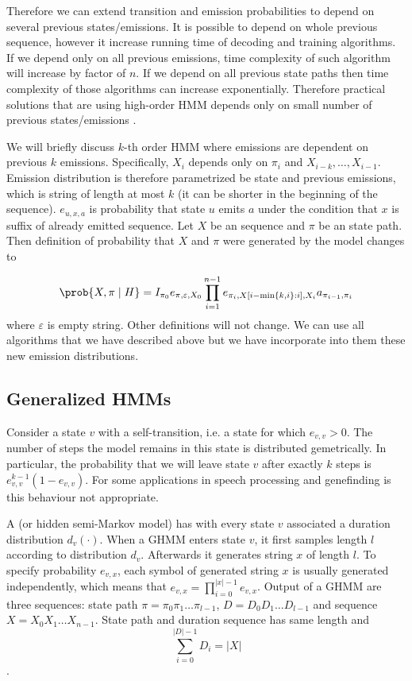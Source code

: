 Therefore we can extend transition and emission probabilities to depend on
several previous states/emissions. It is possible to depend on whole previous
sequence, however it increase running time of decoding and training algorithms.
If we depend only on all previous emissions, time complexity of such algorithm
will increase by factor of $n$. If we depend on all previous state paths then
time complexity of those algorithms can increase exponentially.  Therefore
practical solutions that are using high-order HMM depends only on small number
of previous states/emissions \cite{Brejova2005,dalsie}.

We will briefly discuss $k$-th order HMM where emissions are dependent on
previous $k$ emissions. Specifically, $X_i$ depends only on $\pi_i$ and
$X_{i-k},\dots,X_{i-1}$. Emission distribution is therefore parametrized be
state and previous emissions, which is string of length at most $k$ (it can be
shorter in the beginning of the sequence). $e_{u,x,a}$ is probability that
state $u$ emits $a$ under the condition that $x$ is suffix of already emitted
sequence. Let $X$ be an sequence and $\pi$ be an state path. Then definition
of probability that $X$ and $\pi$ were generated by the model changes to

\[
\prob{X,\pi\mid H} = 
I_{\pi_0}e_{\pi,\varepsilon,X_0}\prod_{i=1}^{n-1}
e_{\pi_i,X[i-\min\{k,i\}:i],X_i}a_{\pi_{i-1},\pi_i}
\]
where $\varepsilon$ is empty string. Other definitions will not change. We can
use all algorithms that we have described above but we have incorporate into
them these new emission distributions.


\subsection{Generalized HMMs}

Consider a state $v$ with a self-transition, i.e. a state for which $e_{v,v}>0$.
The number of steps the model remains in this state is distributed gemetrically.
In particular, the probability that we will leave state $v$ after exactly $k$ steps is
$e_{v,v}^{k-1}(1-e_{v,v})$. For some
applications in speech processing and genefinding is this behaviour not
appropriate\cite{}.

A  (or hidden semi-Markov model)
has with every state $v$ associated a duration distribution $d_v(\cdot)$.  When
a GHMM enters state $v$, it first samples length $l$ according
to distribution $d_v$.  Afterwards it generates string $x$ of length $l$.  To
specify probability $e_{v,x}$, each symbol of generated string $x$ is usually
generated independently, which means that $e_{v,x}=\prod_{i=0}^{|x|-1}e_{v,x}$.
Output of a GHMM are three sequences: state path $\pi=\pi_0\pi_1\dots\pi_{l-1}$,
 $D=D_0D_1\dots D_{l-1}$ and sequence
$X=X_0X_1\dots X_{n-1}$.  State path and duration sequence has same
length and \[\sum_{i=0}^{|D|-1}D_i = |X|\].

